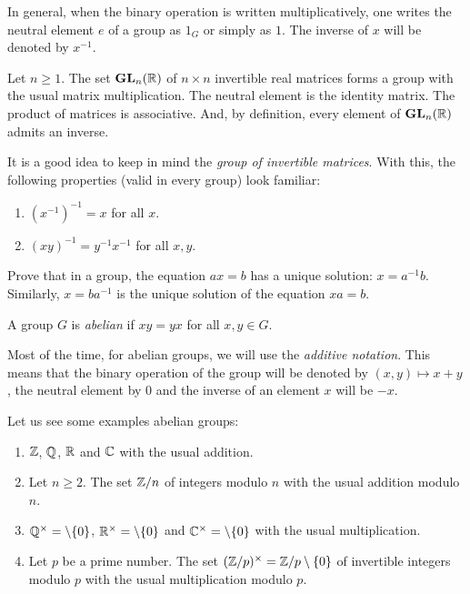 In general, when the binary operation is written multiplicatively, one
writes the neutral element $e$ of a group as $1_G$ or simply as $1$. The inverse of $x$ will be 
denoted by $x^{-1}$. 

\begin{example}
    Let $n\geq1$. The set $\mathbf{GL}_n(\mathbb{R})$ of $n\times n$ invertible real 
matrices forms a
    group with the usual matrix multiplication. The neutral element is the identity matrix. The product 
    of matrices is associative. And, by definition, every element of $\mathbf{GL}_n(\mathbb{R})$ admits an inverse. 
\end{example}

It is a good idea to keep in mind the \emph{group of invertible matrices}. 
With this, the following properties (valid in every group) look familiar:
\begin{enumerate}
    \item $(x^{-1})^{-1}=x$ for all $x$.
    \item $(xy)^{-1}=y^{-1}x^{-1}$ for all $x,y$. 
\end{enumerate}

\begin{exercise}
\label{xca:ax=b}
    Prove that in a group, the equation $ax=b$ has 
    a unique solution: $x=a^{-1}b$. Similarly, 
    $x=ba^{-1}$ is the unique solution of the equation
    $xa=b$. 
\end{exercise}

\begin{definition}
    A group $G$ is \emph{abelian} if $xy=yx$ for all $x,y\in G$. 
\end{definition}

Most of the time, for abelian groups, we will use 
the \emph{additive notation}. This means that the binary operation
of the group will be denoted by $(x,y)\mapsto x+y$, the neutral
element by $0$ and 
the inverse of an element $x$ will be $-x$. 

\begin{example}
\label{exa:abelian_groups}
    Let us see some examples 
    abelian groups: 
    \begin{enumerate}
        \item $\mathbb{Z}$, $\mathbb{Q}$, $\mathbb{R}$ and $\mathbb{C}$ with the usual addition. 
        \item Let $n\geq2$. The set $\mathbb{Z}/n$ of integers modulo $n$ with the usual addition modulo $n$.
        \item $\mathbb{Q}^\times=\setminus\{0\}$, $\mathbb{R}^\times=\setminus\{0\}$ and $\mathbb{C}^\times=\setminus\{0\}$ 
        with the usual multiplication.
        \item Let $p$ be a prime number. The set $(\mathbb{Z}/p)^{\times}=\mathbb{Z}/p\setminus\{0\}$ of invertible integers modulo $p$ 
            with the usual multiplication modulo $p$. 
    \end{enumerate}
\end{example}

